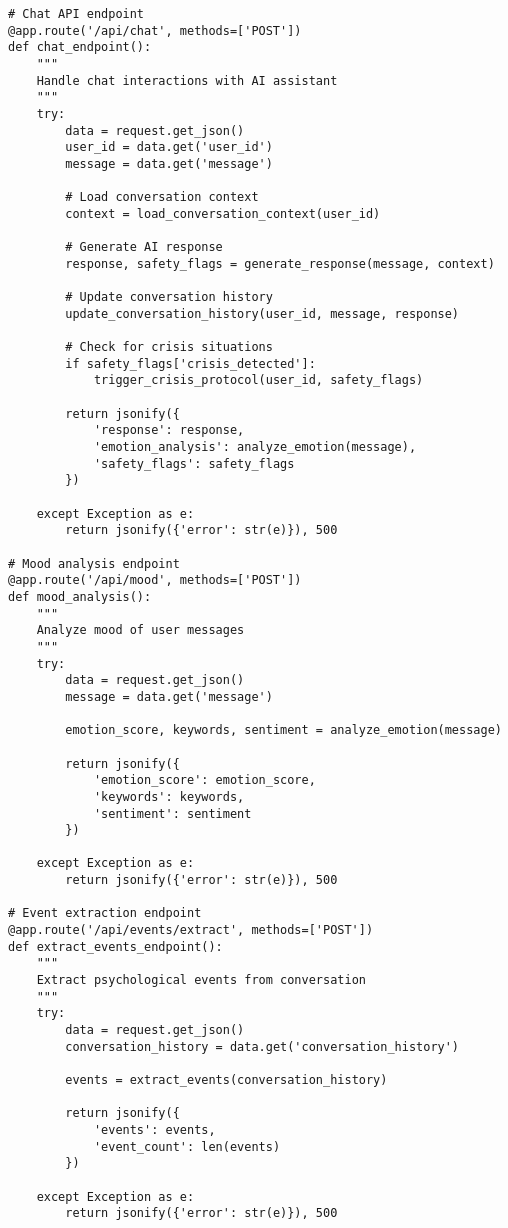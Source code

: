 \begin{verbatim}
# Chat API endpoint
@app.route('/api/chat', methods=['POST'])
def chat_endpoint():
    """
    Handle chat interactions with AI assistant
    """
    try:
        data = request.get_json()
        user_id = data.get('user_id')
        message = data.get('message')
        
        # Load conversation context
        context = load_conversation_context(user_id)
        
        # Generate AI response
        response, safety_flags = generate_response(message, context)
        
        # Update conversation history
        update_conversation_history(user_id, message, response)
        
        # Check for crisis situations
        if safety_flags['crisis_detected']:
            trigger_crisis_protocol(user_id, safety_flags)
        
        return jsonify({
            'response': response,
            'emotion_analysis': analyze_emotion(message),
            'safety_flags': safety_flags
        })
        
    except Exception as e:
        return jsonify({'error': str(e)}), 500

# Mood analysis endpoint
@app.route('/api/mood', methods=['POST'])
def mood_analysis():
    """
    Analyze mood of user messages
    """
    try:
        data = request.get_json()
        message = data.get('message')
        
        emotion_score, keywords, sentiment = analyze_emotion(message)
        
        return jsonify({
            'emotion_score': emotion_score,
            'keywords': keywords,
            'sentiment': sentiment
        })
        
    except Exception as e:
        return jsonify({'error': str(e)}), 500

# Event extraction endpoint
@app.route('/api/events/extract', methods=['POST'])
def extract_events_endpoint():
    """
    Extract psychological events from conversation
    """
    try:
        data = request.get_json()
        conversation_history = data.get('conversation_history')
        
        events = extract_events(conversation_history)
        
        return jsonify({
            'events': events,
            'event_count': len(events)
        })
        
    except Exception as e:
        return jsonify({'error': str(e)}), 500
\end{verbatim} 